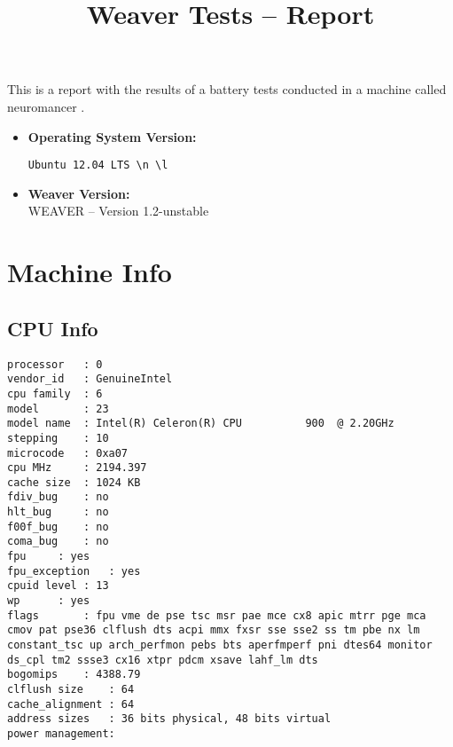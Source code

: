 \documentclass{article}
\title{Weaver Tests -- Report}
\begin{document}
\maketitle
This is a report with the results of a battery
tests conducted in a machine called 
neuromancer
.
\begin{itemize}
\item
\textbf{Operating System Version: }
\begin{verbatim}
Ubuntu 12.04 LTS \n \l

\end{verbatim}
\item
\textbf{Weaver Version: }\\
WEAVER -- Version 1.2-unstable
\end{itemize}
\section{Machine Info}
\subsection{CPU Info}
\begin{verbatim}
processor	: 0
vendor_id	: GenuineIntel
cpu family	: 6
model		: 23
model name	: Intel(R) Celeron(R) CPU          900  @ 2.20GHz
stepping	: 10
microcode	: 0xa07
cpu MHz		: 2194.397
cache size	: 1024 KB
fdiv_bug	: no
hlt_bug		: no
f00f_bug	: no
coma_bug	: no
fpu		: yes
fpu_exception	: yes
cpuid level	: 13
wp		: yes
flags		: fpu vme de pse tsc msr pae mce cx8 apic mtrr pge mca cmov pat pse36 clflush dts acpi mmx fxsr sse sse2 ss tm pbe nx lm constant_tsc up arch_perfmon pebs bts aperfmperf pni dtes64 monitor ds_cpl tm2 ssse3 cx16 xtpr pdcm xsave lahf_lm dts
bogomips	: 4388.79
clflush size	: 64
cache_alignment	: 64
address sizes	: 36 bits physical, 48 bits virtual
power management:

\end{verbatim}
\end{document}
